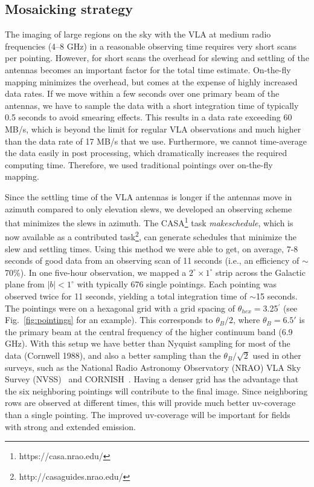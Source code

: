 \documentclass{aa}
\begin{document}
\subsection{Mosaicking strategy}

The imaging of large regions on the sky with the VLA at medium radio frequencies (4--8 GHz) in a reasonable observing time requires very short scans per pointing. However, for short scans the overhead for slewing
and settling of the antennas becomes an important factor for the total time estimate. On-the-fly mapping 
minimizes the overhead, but comes at the expense of highly increased data rates. If we move within a few
seconds over one primary beam of the antennas, we have to sample the data with a short integration time of 
typically 0.5 seconds to avoid smearing effects.  This  results in a data rate exceeding 60 MB/s, which
is beyond the limit for regular VLA observations and much higher than the data rate of 17 MB/s that we use. Furthermore,
we cannot  time-average the data easily
in post processing, which dramatically increases the required computing time. Therefore, we used
traditional pointings over on-the-fly mapping.



Since the settling time of the VLA antennas is longer if the antennas move in azimuth compared to only elevation slews, we   developed an observing scheme that minimizes the slews in azimuth. The CASA\footnote{https://casa.nrao.edu/} task {\it makeschedule}, which is now available as a contributed task\footnote{http://casaguides.nrao.edu/}, can generate schedules that minimize the slew and settling times. Using this method we were able to get, on average, 7-8 seconds of good data from an observing scan of 11 seconds (i.e., an efficiency of $\sim$70\%). In one five-hour observation, we mapped a $2^\circ\times1^\circ$ strip across the Galactic plane from $|b|<1^\circ$ with
typically 676 single pointings. Each pointing was observed twice for 11 seconds, yielding a total integration
time of $\sim$15 seconds. The pointings were on a hexagonal grid with a grid spacing of
$\theta_{hex}=$3.25$^\prime$ (see Fig.~\ref{fig:pointings} for an example). This corresponds to $\theta_B/2$,
where $\theta_B=6.5'$ is the primary beam at the central
frequency of the higher continuum band (6.9 GHz).  With this setup we have better than
Nyquist sampling for most of the data (Cornwell 1988), and also a better sampling than the  $\theta_B/\sqrt2$
used in other surveys, such as the National Radio Astronomy Observatory (NRAO) VLA Sky Survey
(NVSS)~\citep{CondonCottonGreisen1998} and
CORNISH~\citep{HoarePurcellChurchwell2012}. Having a denser grid has the advantage that the six neighboring pointings will contribute to the final image. Since neighboring rows are observed at different times, this will provide much better uv-coverage than a single pointing. The improved uv-coverage will be important for fields with strong and extended emission.
\end{document}
